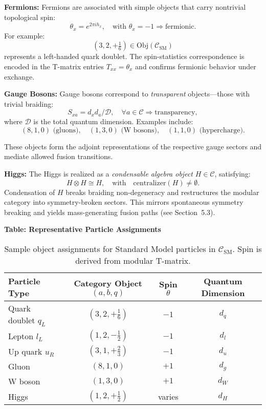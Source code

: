 \documentclass[11pt]{article}
\begin{document}
\vspace{0.5em}
\noindent\textbf{Fermions:}  
Fermions are associated with simple objects that carry nontrivial topological spin:
\[
\theta_x = e^{2\pi i h_x}, \quad \text{with } \theta_x = -1 \Rightarrow \text{fermionic}.
\]
For example:
\[
(3, 2, +\tfrac{1}{6}) \in \text{Obj}(\mathcal{C}_{\text{SM}})
\]
represents a left-handed quark doublet. The spin-statistics correspondence is encoded in the T-matrix entries \( T_{xx} = \theta_x \) and confirms fermionic behavior under exchange.

\vspace{0.5em}
\noindent\textbf{Gauge Bosons:}  
Gauge bosons correspond to \emph{transparent} objects—those with trivial braiding:
\[
S_{xa} = d_x d_a / \mathcal{D}, \quad \forall a \in \mathcal{C} \Rightarrow \text{transparency},
\]
where \( \mathcal{D} \) is the total quantum dimension. Examples include:
\[
(8,1,0) \text{ (gluons)}, \quad (1,3,0) \text{ (W bosons)}, \quad (1,1,0) \text{ (hypercharge)}.
\]

These objects form the adjoint representations of the respective gauge sectors and mediate allowed fusion transitions.

\vspace{0.5em}
\noindent\textbf{Higgs:}  
The Higgs is realized as a \emph{condensable algebra object} \( H \in \mathcal{C} \), satisfying:
\[
H \otimes H \cong H, \quad \text{with} \quad \text{centralizer}(H) \neq \emptyset.
\]
Condensation of \( H \) breaks braiding non-degeneracy and restructures the modular category into symmetry-broken sectors. This mirrors spontaneous symmetry breaking and yields mass-generating fusion paths (see Section~5.3).

\vspace{0.8em}
\noindent\textbf{Table: Representative Particle Assignments}

\begin{table}[H]
\centering
\renewcommand{\arraystretch}{1.2}
\begin{tabular}{|l|c|c|c|}
\hline
\textbf{Particle Type} & \textbf{Category Object \( (a,b,q) \)} & \textbf{Spin \( \theta \)} & \textbf{Quantum Dimension} \\
\hline
Quark doublet \( q_L \) & \( (3,2,+\tfrac{1}{6}) \) & \( -1 \) & \( d_q \) \\
Lepton \( l_L \) & \( (1,2,-\tfrac{1}{2}) \) & \( -1 \) & \( d_l \) \\
Up quark \( u_R \) & \( (3,1,+\tfrac{2}{3}) \) & \( -1 \) & \( d_u \) \\
Gluon & \( (8,1,0) \) & \( +1 \) & \( d_g \) \\
W boson & \( (1,3,0) \) & \( +1 \) & \( d_W \) \\
Higgs & \( (1,2,+\tfrac{1}{2}) \) & varies & \( d_H \) \\
\hline
\end{tabular}
\caption{Sample object assignments for Standard Model particles in \( \mathcal{C}_{\text{SM}} \). Spin is derived from modular T-matrix.}
\label{tab:sm-object-classes}
\end{table}
\end{document}
